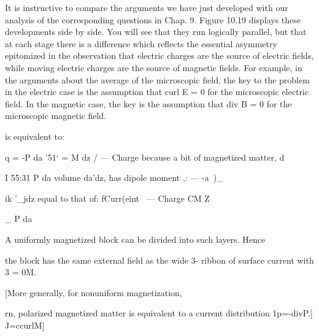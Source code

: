 It is instructive to compare the arguments we have just developed
with our analysis of the corresponding questions in Chap. 9. Figure
10.19 displays these developments side by side. You will see that
they run logically parallel, but that at each stage there is a difference
which reflects the essential asymmetry epitomized in the observation
that electric charges are the source of electric fields, while moving
electric charges are the source of magnetic fields. For example, in
the arguments about the average of the microscopic field, the key
to the problem in the electric case is the assumption that curl E = 0
for the microscopic electric field. In the magnetic case, the key is
the assumption that div B = 0 for the microscopic magnetic field.

is equivalent to:
\begin{equation}
\end{equation}

     

q = -P da '51‘ = M dz
/ ---  Charge because a bit of magnetized matter, d

I 55:31 P da volume da'dz, has dipole moment ,: --- -a~)_

ik '_jdz equal to that of: fCurr(eint
\ --- Charge CM Z

_ P da 

A uniformly magnetized block can
be divided into such layers. Hence

the block has the
same external  
field as the wide  3-
ribbon of surface 
current with 3 = 0M.

[More generally, for nonuniform magnetization,

rn, polarized magnetized matter is equivalent to a current distribution
1p=-divP.] J=ccurlM]

      

